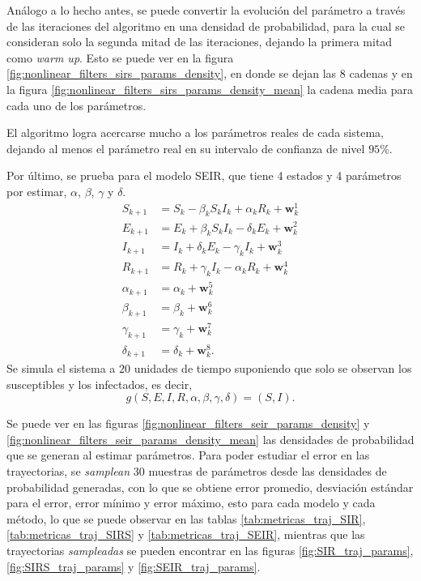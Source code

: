Análogo a lo hecho antes, se puede convertir la evolución del parámetro a través de las iteraciones del algoritmo en una densidad de probabilidad, para la cual se consideran solo la segunda mitad de las iteraciones, dejando la primera mitad como \textit{warm up}. Esto se puede ver en la figura \ref{fig:nonlinear_filters_sirs_params_density}, en donde se dejan las $8$ cadenas y en la figura \ref{fig:nonlinear_filters_sirs_params_density_mean} la cadena media para cada uno de los parámetros.

El algoritmo logra acercarse mucho a los parámetros reales de cada sistema, dejando al menos el parámetro real en su intervalo de confianza de nivel $95$\%.

Por último, se prueba para el modelo SEIR, que tiene 4 estados y 4 parámetros por estimar, $\alpha$, $\beta$, $\gamma$ y $\delta$.
\begin{equation*}
    \begin{aligned}
        S_{k+1} &= S_k - \beta_k S_k I_k + \alpha_k R_k + \mathbf{w}_k^1 \\
        E_{k+1} &= E_k + \beta_k S_k I_k - \delta_k E_k + \mathbf{w}_k^2 \\
        I_{k+1} &= I_k + \delta_k E_k - \gamma_k I_k + \mathbf{w}_k^3 \\
        R_{k+1} &= R_k + \gamma_k I_k - \alpha_k R_k + \mathbf{w}_k^4 \\
        \alpha_{k+1} &= \alpha_k + \mathbf{w}_k^5 \\
        \beta_{k+1} &= \beta_k + \mathbf{w}_k^6 \\
        \gamma_{k+1} &= \gamma_k + \mathbf{w}_k^7 \\
        \delta_{k+1} &= \delta_k + \mathbf{w}_k^8.
    \end{aligned}
\end{equation*}
Se simula el sistema a $20$ unidades de tiempo suponiendo que solo se observan los susceptibles y los infectados, es decir,
\begin{equation*}
    g(S, E, I, R, \alpha, \beta, \gamma, \delta) = (S, I).
\end{equation*}

Se puede ver en las figuras \ref{fig:nonlinear_filters_seir_params_density} y \ref{fig:nonlinear_filters_seir_params_density_mean} las densidades de probabilidad que se generan al estimar parámetros. Para poder estudiar el error en las trayectorias, se \textit{samplean} 30 muestras de parámetros desde las densidades de probabilidad generadas, con lo que se obtiene error promedio, desviación estándar para el error, error mínimo y error máximo, esto para cada modelo y cada método, lo que se puede observar en las tablas \ref{tab:metricas_traj_SIR}, \ref{tab:metricas_traj_SIRS} y \ref{tab:metricas_traj_SEIR}, mientras que las trayectorias \textit{sampleadas} se pueden encontrar en las figuras \ref{fig:SIR_traj_params}, \ref{fig:SIRS_traj_params} y \ref{fig:SEIR_traj_params}.

